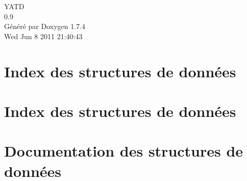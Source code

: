 \documentclass[a4paper]{book}
\begin{document}
\hypersetup{pageanchor=false}
\begin{titlepage}
\vspace*{7cm}
\begin{center}
{\Large YATD \\[1ex]\large 0.9 }\\
\vspace*{1cm}
{\large Généré par Doxygen 1.7.4}\\
\vspace*{0.5cm}
{\small Wed Jun 8 2011 21:40:43}\\
\end{center}
\end{titlepage}
\clearemptydoublepage
{}
\tableofcontents
\clearemptydoublepage
{}
\hypersetup{pageanchor=true}
\chapter{Index des structures de données}

\chapter{Index des structures de données}

\chapter{Documentation des structures de données}











\printindex
\end{document}
